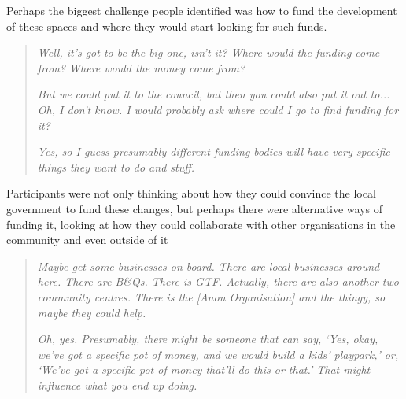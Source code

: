 Perhaps the biggest challenge people identified was how to fund the development of these spaces and where they would start looking for such funds.
\begin{quote}
    \textit{Well, it's got to be the big one, isn't it? Where would the funding come from? Where would the money come from?}
    
    \textit{But we could put it to the council, but then you could also put it out to... Oh, I don't know. I would probably ask where could I go to find funding for it?}
    
    \textit{Yes, so I guess presumably different funding bodies will have very specific things they want to do and stuff.}
\end{quote}

Participants were not only thinking about how they could convince the local government to fund these changes, but perhaps there were alternative ways of funding it, looking at how they could collaborate with other organisations in the community and even outside of it
\begin{quote}
    \textit{Maybe get some businesses on board. There are local businesses around here. There are B\&Qs. There is GTF. Actually, there are also another two community centres. There is the [Anon Organisation] and the thingy, so maybe they could help.}
    
    \textit{Oh, yes. Presumably, there might be someone that can say, `Yes, okay, we've got a specific pot of money, and we would build a kids' playpark,' or, `We've got a specific pot of money that'll do this or that.' That might influence what you end up doing.}
\end{quote}

